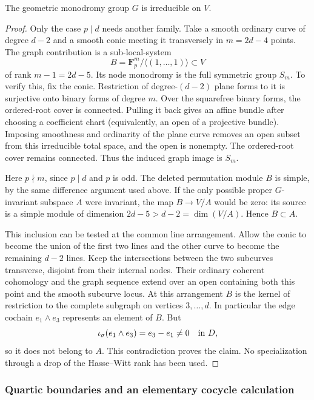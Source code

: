 \begin{proposition}\label{prop:odd-plane-irreducible}
The geometric monodromy group $G$ is irreducible on $V$.
\end{proposition}

\begin{proof}
Only the case $p\mid d$ needs another family.  Take a smooth ordinary
curve of degree $d-2$ and a smooth conic meeting it transversely in
$m=2d-4$ points.  The graph contribution is a sub-local-system
\[
 B=\mathbf F_p^m/\langle(1,\ldots,1)\rangle\subset V
\]
of rank $m-1=2d-5$.  Its node monodromy is the full symmetric group
$S_m$.  To verify this, fix the conic.  Restriction of degree-$(d-2)$
plane forms to it is surjective onto binary forms of degree $m$.
Over the squarefree binary forms, the ordered-root cover is connected.
Pulling it back gives an affine bundle after choosing a coefficient
chart (equivalently, an open of a projective bundle).  Imposing
smoothness and ordinarity of the plane curve removes an open subset
from this irreducible total space, and the open is nonempty.  The
ordered-root cover remains connected.  Thus the induced graph image
is $S_m$.

Here $p\nmid m$, since $p\mid d$ and $p$ is odd.  The deleted
permutation module $B$ is simple, by the same difference argument
used above.  If the only possible proper $G$-invariant subspace $A$
were invariant, the map $B\to V/A$ would be zero: its source is a
simple module of dimension $2d-5>d-2=\dim(V/A)$.  Hence $B\subset A$.

This inclusion can be tested at the common line arrangement.  Allow
the conic to become the union of the first two lines and the other
curve to become the remaining $d-2$ lines.  Keep the intersections
between the two subcurves transverse, disjoint from their internal
nodes.  Their ordinary coherent cohomology and the graph sequence
extend over an open containing both this point and the smooth
subcurve locus.  At this arrangement $B$ is the kernel of restriction
to the complete subgraph on vertices $3,\ldots,d$.  In particular the
edge cochain $e_1\wedge e_3$ represents an element of $B$.  But
\[
 \iota_\sigma(e_1\wedge e_3)=e_3-e_1\ne0\quad\hbox{in }D,
\]
so it does not belong to $A$.  This contradiction proves the claim.
No specialization through a drop of the Hasse--Witt rank has been
used.
\end{proof}

\subsubsection{Quartic boundaries and an elementary cocycle calculation}

